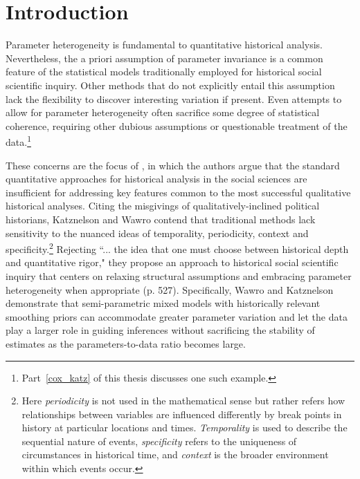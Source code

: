 \chapter{Introduction}
\label{introduction}

Parameter heterogeneity is fundamental to quantitative historical analysis. 
Nevertheless, the a priori assumption of parameter invariance is a common feature 
of the statistical models traditionally employed for historical social
scientific inquiry. Other methods that do not explicitly entail this assumption lack the flexibility to 
discover interesting variation if present.  Even attempts to allow for parameter heterogeneity 
often sacrifice some degree of statistical coherence, requiring other dubious assumptions or 
questionable treatment of the data.\footnote{Part~\ref{cox_katz} of this thesis discusses one 
such example.} 


These concerns are the focus of , in which the authors argue 
that the standard quantitative approaches for historical 
analysis in the social sciences are insufficient for addressing key features common to 
the most successful qualitative historical analyses. Citing the misgivings of qualitatively-inclined 
political historians, Katznelson and Wawro contend that traditional methods lack sensitivity to 
the nuanced ideas of temporality, periodicity, context and specificity.\footnote{Here 
{\it periodicity} is not used in the mathematical sense but rather refers how relationships between 
variables are influenced differently by break points in history at particular locations and times. 
{\it Temporality} is used to describe the sequential nature of events, {\it specificity} refers to   
the uniqueness of circumstances in historical time, and {\it context} is the broader environment 
within which events occur.}  
Rejecting ``... the idea that one must choose between historical depth and quantitative rigor," 
they propose an approach to historical social scientific inquiry that centers on relaxing structural 
assumptions and embracing parameter heterogeneity when appropriate (p. 527). Specifically, 
Wawro and Katznelson demonstrate that semi-parametric mixed models with historically relevant 
smoothing priors can accommodate greater parameter variation and let the data play a larger role 
in guiding inferences without sacrificing the stability of estimates as the parameters-to-data ratio 
becomes large.  

